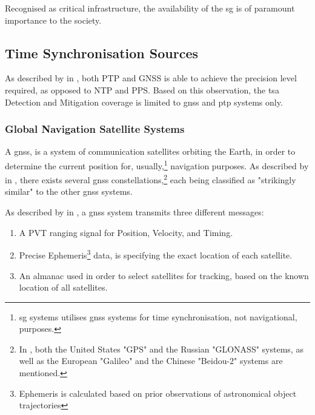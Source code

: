 Recognised as critical infrastructure, the availability of the \acrlong{sg} is of paramount importance to the society. 



\subsection{Time Synchronisation Sources}

As described by \citeauthor{moussa2016security} in \cite{moussa2016security}, both PTP and GNSS is able to achieve the precision level required, as opposed to NTP and PPS.  Based on this observation, the \acrshort{tsa} Detection and Mitigation coverage is limited to \acrshort{gnss} and  \acrshort{ptp} systems only.




\subsubsection{Global Navigation Satellite Systems}

A \acrfull{gnss}, is a system of communication satellites orbiting the Earth, in order to determine the current position for, usually,\footnote{\acrlong{sg} systems utilises \acrshort{gnss} systems for time synchronisation, not navigational, purposes.} navigation  purposes. As described by \citeauthor{schmidt2016survey} in \cite{schmidt2016survey}, there exists several \acrshort{gnss} constellations,\footnote{In \cite{schmidt2016survey}, both the United States "GPS" and the Russian "GLONASS" systems, as well as the European "Galileo" and the Chinese "Beidou-2" systems are mentioned.} each being classified as "strikingly similar" to the other \acrshort{gnss} systems. 








As described by \citeauthor{schmidt2016survey} in  \cite{schmidt2016survey},  a \acrshort{gnss} system transmits three different messages:

\begin{enumerate}
    \item A PVT ranging signal for Position, Velocity, and Timing.
    \item Precise Ephemeris\footnote{Ephemeris is calculated based on prior observations of astronomical object trajectories} data, is specifying the exact location of each satellite.
    \item An almanac used in order to select satellites for tracking, based on the known location of all satellites. 
    
\end{enumerate}

